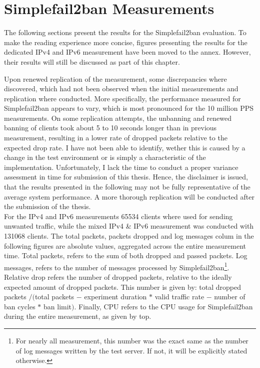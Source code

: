 \pagebreak

\section{Simplefail2ban Measurements}

The following sections present the results for the Simplefail2ban evaluation. To make the reading experience more concise, figures presenting the results 
for the dedicated \ac{IPv4} and \ac{IPv6} measurement have been moved to the annex. However, their results will still be discussed as part of this chapter.

Upon renewed replication of the measurement, some discrepancies where discovered, which had not been observed when the initial measurements and replication where conducted.
More specifically, the performance measured for Simplefail2ban appears to vary, which is most pronounced for the 10 million \ac{PPS} measurements. On some replication attempts, 
the unbanning and renewed banning of clients took about 5 to 10 seconds longer than in previous measurement, resulting in a lower rate of dropped packets relative to the expected drop rate.
I have not been able to identify, wether this is caused by a change in the test environment or is simply a characteristic of the implementation. Unfortunately, I lack the time
to conduct a proper variance assessment in time for submission of this thesis. Hence, the disclaimer is issued, that the results presented in the following may not be fully
representative of the average system performance. A more thorough replication will be conducted after the submission of the thesis. \\ 

For the \ac{IPv4} and \ac{IPv6} measurements 65534 clients where used for sending unwanted traffic,
while the mixed \ac{IPv4} \& \ac{IPv6} measurement was conducted with 131068 clients. The total packets, packets dropped and
log messages colum in the following figures are absolute values, aggregated across the entire measurement time. Total packets, refers to the sum of both dropped and passed packets. Log messages, refers to the number of messages processed by Simplefail2ban\footnote{For nearly all measurement, this number was the exact same as the number of log messages written by the test server. If not, it will be explicitly stated otherwise.}.
Relative drop refers the number of dropped packets, relative to the ideally expected amount of dropped packets. This number is given by: total dropped packets $/ ($total packets $-$ experiment duration $*$ valid traffic rate $-$ number of ban cycles $*$ ban limit$)$. Finally, \ac{CPU} refers to the \ac{CPU} usage for Simplefail2ban
during the entire measurement, as given by top. 

